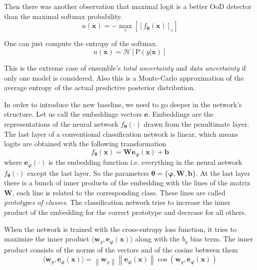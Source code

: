 \documentclass{article}
\newcommand{\norm}[1]{\left\lVert#1\right\rVert}
\begin{document}
Then there was another observation \cite{max_logit} that maximal logit is a better OoD detector than the maximal softmax probability.
\begin{equation}
u(\boldsymbol{x}) = -\max\limits_c [[f_{\boldsymbol{\theta}}(\boldsymbol{x})]_c]
\end{equation}

One can just compute the entropy of the softmax.
\begin{equation}
u(\boldsymbol{x}) = \mathcal{H}[\mathrm{P}(y | \boldsymbol{x})]
\end{equation}

This is the extreme case of ensemble's \textit{total uncertainty} and \textit{data uncertainty} if only one model is considered.
Also this is a Monte-Carlo approximation of the average entropy of the actual predictive posterior distribution.

In order to introduce the new baseline, we need to go deeper in the network's structure.
Let us call the embeddings vectors $\boldsymbol{e}$.
Embeddings are the representations of the neural network $f_{\boldsymbol{\theta}}(\cdot)$ drawn from the penultimate layer.
The last layer of a conventional classification network is linear, which means logits are obtained with the following transformation
\begin{equation}
f_{\boldsymbol{\theta}}(\boldsymbol{x}) = \boldsymbol{W} \boldsymbol{e}_{\boldsymbol{\varphi}}(\boldsymbol{x}) + \boldsymbol{b}
\end{equation}
where $\boldsymbol{e}_{\boldsymbol{\varphi}}(\cdot)$ is the embedding function i.e. everything in the neural network $f_{\boldsymbol{\theta}}(\cdot)$ except the last layer. So the parameters $\boldsymbol{\theta} = \{\boldsymbol{\varphi}, \boldsymbol{W}, \boldsymbol{b}\}$.
At the last layer there is a bunch of inner products of the embedding with the lines of the matrix $\boldsymbol{W}$, each line is related to the corresponding class.
These lines are called \textit{prototypes of classes}.
The classification network tries to increase the inner product of the embedding for the correct prototype and decrease for all others.

When the network is trained with the cross-entropy loss function, it tries to maximize the inner product $\langle \boldsymbol{w}_y, \boldsymbol{e}_{\boldsymbol{\varphi}}(\boldsymbol{x}) \rangle$ along with the $b_y$ bias term. The inner product consists of the norms of the vectors and of the cosine between them
\begin{equation}
\langle \boldsymbol{w}_y, \boldsymbol{e}_{\boldsymbol{\varphi}}(\boldsymbol{x}) \rangle = \norm{\boldsymbol{w}_y} \norm{\boldsymbol{e}_{\boldsymbol{\varphi}}(\boldsymbol{x})} \cos(\boldsymbol{w}_y, \boldsymbol{e}_{\boldsymbol{\varphi}}(\boldsymbol{x}))
\end{equation}
\end{document}
